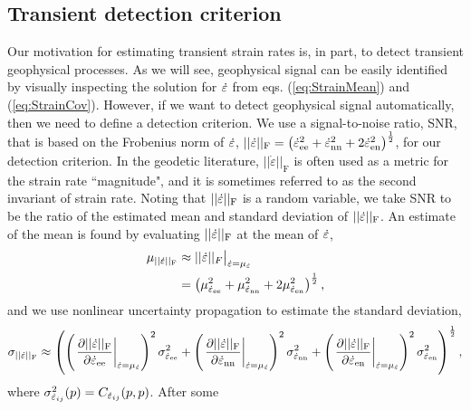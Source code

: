 \documentclass[extra,mreferee]{gji}
\begin{document}
\subsection{Transient detection criterion}\label{sec:TransientDetection}

Our motivation for estimating transient strain rates is, in part, to
detect transient geophysical processes. As we will see, geophysical
signal can be easily identified by visually inspecting the solution
for $\dot\varepsilon$ from eqs. (\ref{eq:StrainMean}) and
(\ref{eq:StrainCov}). However, if we want to detect geophysical signal
automatically, then we need to define a detection criterion. We use a
signal-to-noise ratio, SNR, that is based on the Frobenius norm of
$\dot\varepsilon$, $||\dot\varepsilon||_\mathrm{F} = \left(\dot\varepsilon_{\mathrm{e}\mathrm{e}}^2 +
\dot\varepsilon_{\mathrm{n}\mathrm{n}}^2 + 2\dot\varepsilon_{\mathrm{e}\mathrm{n}}^2\right)^{\frac{1}{2}}$, for our
detection criterion. In the geodetic literature,
$||\dot{\varepsilon}||_\mathrm{F}$ is often used as a metric for the
strain rate ``magnitude", and it is sometimes referred to as the
second invariant of strain rate. Noting that $||\dot\varepsilon||_\mathrm{F}$
is a random variable, we take SNR to be the ratio of the estimated
mean and standard deviation of $||\dot\varepsilon||_\mathrm{F}$. An estimate
of the mean is found by evaluating $||\dot\varepsilon||_\mathrm{F}$ at the
mean of $\dot\varepsilon$,
\begin{align}
\mu_{||\dot\varepsilon||_\mathrm{F}} &\approx ||\dot\varepsilon||_F \big|_{\dot\varepsilon = \mu_{\dot\varepsilon}}\nonumber \\
                             &= \left(\mu_{\dot\varepsilon_{\mathrm{e}\mathrm{e}}}^2 + 
                                      \mu_{\dot\varepsilon_{\mathrm{n}\mathrm{n}}}^2 + 
                                      2\mu_{\dot\varepsilon_{\mathrm{e}\mathrm{n}}}^2 \right)^\frac{1}{2},
\end{align}
and we use nonlinear uncertainty propagation to estimate the standard
deviation,
\begin{equation}
\sigma_{||\dot\varepsilon||_\mathrm{F}} \approx
\left( \left(\left. \frac{\partial ||\dot\varepsilon||_\mathrm{F}}{\partial \dot\varepsilon_{\mathrm{e}\mathrm{e}}}\right|_{\dot\varepsilon = \mu_{\dot\varepsilon}} \right)^2 
       \sigma^2_{\dot\varepsilon_{\mathrm{e}\mathrm{e}}} +
       \left(\left. \frac{\partial ||\dot\varepsilon||_\mathrm{F}}{\partial \dot\varepsilon_{\mathrm{n}\mathrm{n}}}\right|_{\dot\varepsilon = \mu_{\dot\varepsilon}} \right)^2
       \sigma^2_{\dot\varepsilon_{\mathrm{n}\mathrm{n}}} +
       \left(\left. \frac{\partial ||\dot\varepsilon||_\mathrm{F}}{\partial \dot\varepsilon_{\mathrm{e}\mathrm{n}}}\right|_{\dot\varepsilon = \mu_{\dot\varepsilon}} \right)^2 
       \sigma^2_{\dot\varepsilon_{\mathrm{e}\mathrm{n}}} \right)^\frac{1}{2},
\end{equation}
where $\sigma^2_{\dot\varepsilon_{ij}}(p) = C_{\dot\varepsilon_{ij}}(p,p)$. After some
\end{document}
